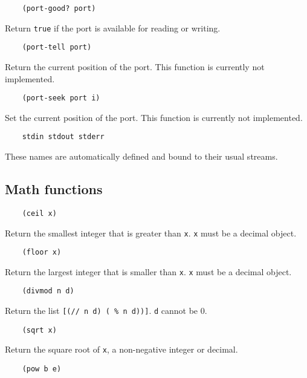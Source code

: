 \documentclass{article}
\newcommand{\inlinecode}{\texttt}
\begin{document}
\begin{verbatim}
    (port-good? port)
\end{verbatim}

Return \inlinecode{true} if the port is available for reading or writing.

\begin{verbatim}
    (port-tell port)
\end{verbatim}

Return the current position of the port. This function is currently not implemented.

\begin{verbatim}
    (port-seek port i)
\end{verbatim}

Set the current position of the port. This function is currently not implemented.

\begin{verbatim}
    stdin stdout stderr
\end{verbatim}

These names are automatically defined and bound to their usual streams.

\subsection{Math functions}
\begin{verbatim}
    (ceil x)
\end{verbatim}

Return the smallest integer that is greater than \inlinecode{x}. \inlinecode{x} must be a decimal object.

\begin{verbatim}
    (floor x)
\end{verbatim}

Return the largest integer that is smaller than \inlinecode{x}. \inlinecode{x} must be a decimal object.

\begin{verbatim}
    (divmod n d)
\end{verbatim}

Return the list \inlinecode{[(// n d)  ( \% n d))]}. \inlinecode{d} cannot be 0.

\begin{verbatim}
    (sqrt x)
\end{verbatim}

Return the square root of \inlinecode{x}, a non-negative integer or decimal.

\begin{verbatim}
    (pow b e)
\end{verbatim}
\end{document}
